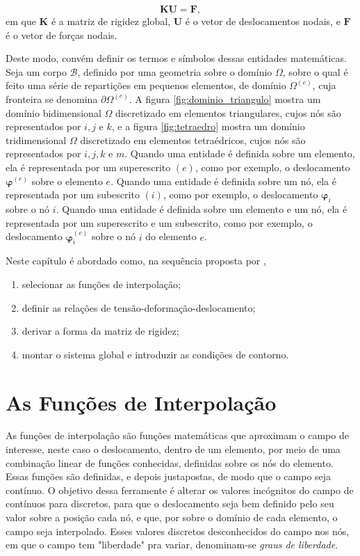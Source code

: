 \begin{equation}
    \bm{K} \bm{U} = \bm{F},
    \label{eq:sistema_global}
\end{equation}
em que $\bm{K}$ é a matriz de rigidez global, $\bm{U}$ é o vetor de deslocamentos nodais, e $\bm{F}$ é o vetor de forças nodais.

Deste modo, convém definir os termos e símbolos dessas entidades matemáticas. Seja um corpo $\mathcal{B}$, definido por uma geometria sobre o domínio $\Omega$, sobre o qual é feito uma série de repartições em pequenos elementos, de domínio $\Omega^{(e)}$, cuja fronteira se denomina $\partial\Omega^{(e)}$. A figura \ref{fig:dominio_triangulo} mostra um domínio bidimensional $\Omega$ discretizado em elementos triangulares, cujos nós são representados por $i, j$ e $k$, e a figura \ref{fig:tetraedro} mostra um domínio tridimensional $\Omega$ discretizado em elementos tetraédricos, cujos nós são representados por $i, j, k$ e $m$. Quando uma entidade é definida sobre um elemento, ela é representada por um superescrito $(e)$, como por exemplo, o deslocamento $\bm{\varphi}^{(e)}$ sobre o elemento $e$. Quando uma entidade é definida sobre um nó, ela é representada por um subescrito $(i)$, como por exemplo, o deslocamento $\bm{\varphi}_i$ sobre o nó $i$. Quando uma entidade é definida sobre um elemento e um nó, ela é representada por um superescrito e um subescrito, como por exemplo, o deslocamento $\bm{\varphi}_i^{(e)}$ sobre o nó $i$ do elemento $e$.

Neste capítulo é abordado como, na sequência proposta por ,

\begin{enumerate}
    \item selecionar as funções de interpolação;
    \item definir as relações de tensão-deformação-deslocamento;
    \item derivar a forma da matriz de rigidez;
    \item montar o sistema global e introduzir as condições de contorno.
\end{enumerate}



\section{As Funções de Interpolação}

As funções de interpolação são funções matemáticas que aproximam o campo de interesse, neste caso o deslocamento, dentro de um elemento, por meio de uma combinação linear de funções conhecidas, definidas sobre os nós do elemento. Essas funções são definidas, e depois justapostas, de modo que o campo seja contínuo. O objetivo dessa ferramente é alterar os valores incógnitos do campo de contínuos para discretos, para que o deslocamento seja bem definido pelo seu valor sobre a posição cada nó, e que, por sobre o domínio de cada elemento, o campo seja interpolado. Esses valores discretos desconhecidos do campo nos nós, em que o campo tem "liberdade" pra variar, denominam-se \emph{graus de liberdade}. \cite{LOGAN}

